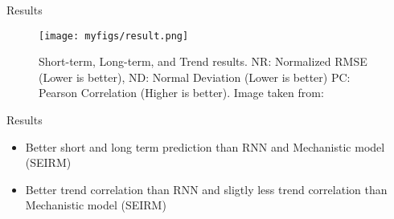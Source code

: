 \documentclass[
	aspectratio=169,	%
	onlytextwidth,		%
	t,					%
	]{beamer}
\begin{document}
\begin{frame}[fragile]{Results}

	\begin{figure}
		\texttt{[image: myfigs/result.png]}
		\caption{Short-term, Long-term, and Trend results. NR: Normalized RMSE (Lower is better), ND: Normal Deviation (Lower is better) PC: Pearson Correlation (Higher is better). Image taken from:~\cite{main}}
	\end{figure}

\end{frame}

\begin{frame}[fragile]{Results}

\begin{itemize}
	\item Better short and long term prediction than RNN and Mechanistic model (SEIRM)
	\item Better trend correlation than RNN and sligtly less trend correlation than Mechanistic model (SEIRM)
\end{itemize}
\end{frame}


\appendix

\makebibliography

\makethankyou
\end{document}
